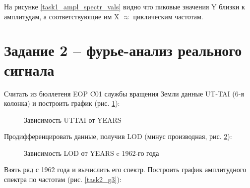 \documentclass[a4paper,oneside,14pt]{extreport}
\begin{document}
На рисунке \ref{task1_ampl_spectr_vals} видно что пиковые значения Y близки к амплитудам, а соответствующие им X $\approx$ циклическим частотам.

\section*{Задание 2 – фурье-анализ реального сигнала}
Считать из бюллетеня EOP C01 службы вращения Земли данные UT-TAI (6-я колонка) и построить график (рис. \ref{task2_g1}):

\begin{figure}[h]
	\caption{Зависимость UTTAI от YEARS}
	\label{task2_g1}
\end{figure}

\newpage
Продифференцировать данные, получив LOD (минус производная, рис. \ref{task2_g2}):

\begin{figure}[h]
	\caption{Зависимость LOD от YEARS c 1962-го года}
	\label{task2_g2}
\end{figure}

Взять ряд с 1962 года  и вычислить его спектр. Построить график амплитудного спектра по частотам (рис. \ref{task2_g3}):
\end{document}
